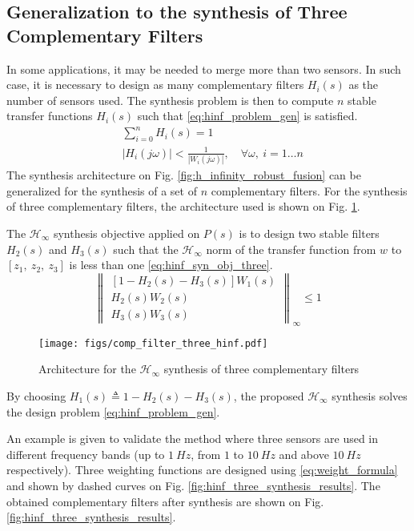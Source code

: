 \documentclass[letterpaper, 10 pt, conference]{ieeeconf}
\begin{document}
\subsection{Generalization to the synthesis of Three Complementary Filters}
\label{sec:orgcb75a24}
\label{sec:hinf_three_comp_filters}
In some applications, it may be needed to merge more than two sensors.
In such case, it is necessary to design as many complementary filters \(H_i(s)\) as the number of sensors used.
The synthesis problem is then to compute \(n\) stable transfer functions \(H_i(s)\) such that \eqref{eq:hinf_problem_gen} is satisfied.
\begin{subequations}
\label{eq:hinf_problem_gen}
  \begin{align}
  & \sum_{i=0}^n H_i(s) = 1 \label{eq:hinf_cond_compl_gen} \\
  & \left| H_i(j\omega) \right| < \frac{1}{\left| W_i(j\omega) \right|}, \quad \forall \omega,\ i = 1 \dots n \label{eq:hinf_cond_perf_gen}
  \end{align}
\end{subequations}
The synthesis architecture on Fig. \ref{fig:h_infinity_robust_fusion} can be generalized for the synthesis of a set of \(n\) complementary filters.
For the synthesis of three complementary filters, the architecture used is shown on Fig. \ref{fig:comp_filter_three_hinf}.

The \(\mathcal{H}_\infty\) synthesis objective applied on \(P(s)\) is to design two stable filters \(H_2(s)\) and \(H_3(s)\) such that the \(\mathcal{H}_\infty\) norm of the transfer function from \(w\) to \([z_1,\ z_2, \ z_3]\) is less than one \eqref{eq:hinf_syn_obj_three}.
\begin{equation}
\label{eq:hinf_syn_obj_three}
  \left\| \begin{matrix} \left[1 - H_2(s) - H_3(s)\right] W_1(s) \\ H_2(s) W_2(s) \\ H_3(s) W_3(s) \end{matrix} \right\|_\infty \le 1
\end{equation}

\begin{figure}[htbp]
\centering
\texttt{[image: figs/comp\_filter\_three\_hinf.pdf]}
\caption{\label{fig:comp_filter_three_hinf}
Architecture for the \(\mathcal{H}_\infty\) synthesis of three complementary filters}
\end{figure}

By choosing \(H_1(s) \triangleq 1 - H_2(s) - H_3(s)\), the proposed \(\mathcal{H}_\infty\) synthesis solves the design problem \eqref{eq:hinf_problem_gen}. \par
An example is given to validate the method where three sensors are used in different frequency bands (up to \(\SI{1}{Hz}\), from \(1\) to \(\SI{10}{Hz}\) and above \(\SI{10}{Hz}\) respectively).
Three weighting functions are designed using \eqref{eq:weight_formula} and shown by dashed curves on Fig. \ref{fig:hinf_three_synthesis_results}.
The obtained complementary filters after synthesis are shown on Fig. \ref{fig:hinf_three_synthesis_results}.
\end{document}
